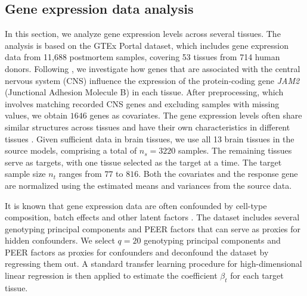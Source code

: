 \documentclass[12pt]{article}
\begin{document}
\subsection{Gene expression data analysis}
\label{subsec:gene}
In this section, we analyze gene expression levels across several tissues.
The analysis is based on the GTEx Portal dataset, which includes gene expression data from 11,688 postmortem samples, covering 53 tissues from 714 human donors. Following \cite{li2022transfer}, we investigate how genes that are associated with the central nervous system (CNS) influence the expression of the protein-coding gene \textit{JAM2} (Junctional Adhesion Molecule B) in each tissue. After preprocessing, which involves matching recorded CNS genes and excluding samples with missing values, we obtain $1646$ genes as covariates. The gene expression levels often share similar structures across tissues and have their own characteristics in different tissues \citep{mele2015human,kryuchkova2017benchmark}. Given sufficient data in brain tissues, we use all 13 brain tissues in the source models, comprising a total of $n_s = 3220$ samples. The remaining tissues serve as targets, with one tissue selected as the target at a time. The target sample size $n_t$ ranges from $77$ to $816$. Both the covariates and the response gene are normalized using the estimated means and variances from the source data. 

It is known that gene expression data are often confounded by cell-type composition, batch effects and other latent factors \citep{jew2020accurate,ye2023batch}.  The dataset includes several genotyping principal components and PEER factors that can serve as proxies for hidden confounders. We select $q=20$ genotyping principal components and PEER factors as proxies for confounders and deconfound the dataset by regressing them out. A standard transfer learning procedure for high-dimensional linear regression is then applied to estimate the coefficient $\beta_t$ for each target tissue.
\end{document}
